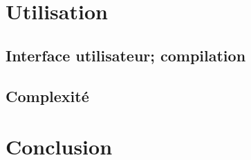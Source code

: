 \documentclass{article}
\begin{document}
\section{Utilisation}

\subsection{Interface utilisateur; compilation}

\subsection{Complexité}

\section*{Conclusion}



\end{document}

